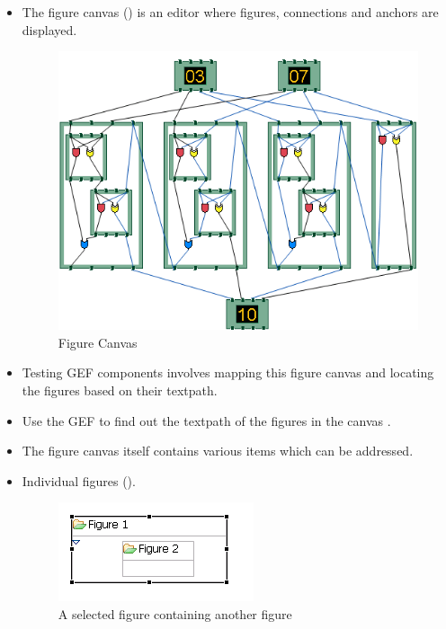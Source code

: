 \begin{itemize}
\item  The figure canvas () is an editor where figures, connections and anchors are displayed. 

\begin{figure}
\begin{center}
\includegraphics{PS/FigureCanvas}
\caption{Figure Canvas}
\label{figurecanvas}
\end{center}
\end{figure}

\item Testing GEF components  involves mapping this figure canvas and locating the figures based on their textpath. 
\item Use the GEF \gdinspector{} to find out the textpath of the figures in the canvas . 
\item The figure canvas itself contains various items which can be addressed. 
\item Individual figures ().

\begin{figure}
\begin{center}
\includegraphics{PS/Figure}
\caption{A selected figure containing another figure}
\label{figure}
\end{center}
\end{figure}


\end{itemize}
